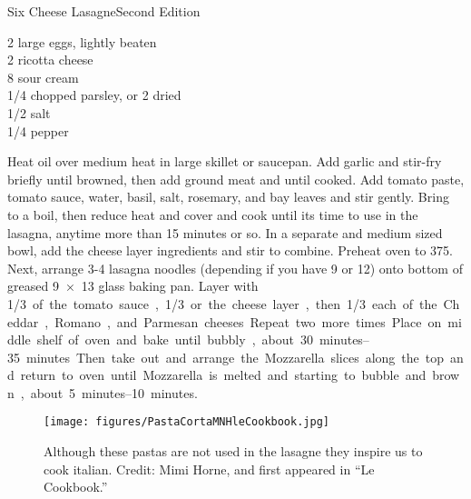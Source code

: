 \begin{entry}{Six Cheese Lasagne}{Second Edition}
\begin{ingredients}
    2 large eggs, lightly beaten\\
    \SI{2}{\cup} ricotta cheese\\
    \SI{8}{\ounce} sour cream \\
    \SI{1/4}{\cup} chopped parsley, or \SI{2}{\tblspoon} dried\\
    \SI{1/2}{\teaspoon} salt\\
    \SI{1/4}{\teaspoon} pepper
\end{ingredients}
%
%
Heat oil over medium heat in large skillet or saucepan. Add garlic and
stir-fry briefly until browned, then add ground meat and \saute until
cooked. Add tomato paste, tomato sauce, water, basil, salt, rosemary, and bay
leaves and stir gently. Bring to a boil, then reduce heat and cover and cook
until its time to use in the lasagna, anytime more than 15 minutes or so. In a
separate and medium sized bowl, add the cheese layer ingredients and stir to
combine. Preheat oven to \SI{375}{\degreeF}. Next, arrange 3-4 lasagna noodles
(depending if you have 9 or 12) onto bottom of greased \SI{9x13}{\inch} glass
baking pan. Layer with \SI{1/3} of the tomato sauce, \SI{1/3} or the cheese
layer, then \SI{1/3} each of the Cheddar, Romano, and Parmesan cheeses. Repeat
two more times. Place on middle shelf of oven and bake until bubbly, about
\SIrange{30}{35}{minutes}. Then take out and arrange the Mozzarella slices
along the top and return to oven until Mozzarella is melted and starting to
bubble and brown, about \SIrange{5}{10}{minutes}.

\begin{figure}
  \centering
  \texttt{[image: figures/PastaCortaMNHleCookbook.jpg]}
  \caption{Although these pastas are not used in the lasagne they inspire us to cook italian. Credit: Mimi Horne, and first appeared in ``Le Cookbook.''}
  \label{fig:mimi_pasta}
\end{figure}

\end{entry}

